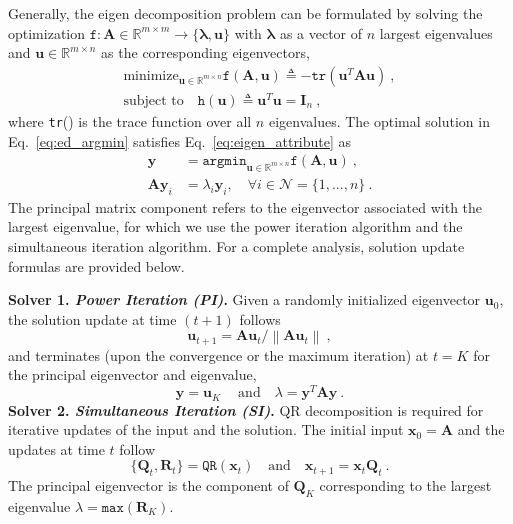 \documentclass{article}
\newcommand{\mb}[1]{\mathbf{#1}}
\newcommand\norm[1]{\left\lVert#1\right\rVert}
\theoremstyle{plain}
\theoremstyle{definition}
\theoremstyle{remark}
\begin{document}
Generally, the eigen decomposition problem can be formulated by solving the optimization $\texttt{f}: \mb{A} \in \mathbb{R}^{m \times m} \rightarrow \{ \boldsymbol{\lambda}, \mb{u} \}$ with $\boldsymbol{\lambda}$ as a vector of $n$ largest eigenvalues and $\mb{u} \in \mathbb{R}^{m \times n}$ as the corresponding eigenvectors,
%
\begin{equation}
\begin{gathered}
\label{eq:ed}
\text{minimize}_{\mb{u} \in \mathbb{R}^{m \times n}} \texttt{f}(\mb{A}, \mb{u}) \triangleq -\texttt{tr} \left( \mb{u}^T \mb{A} \mb{u} \right)\ ,\\
\text{subject to} \quad \texttt{h} \left( \mb{u} \right) \triangleq \mb{u}^T \mb{u} = \mb{I}_n\ ,
\end{gathered}
\end{equation}
%
where \texttt{tr}() is the trace function over all $n$ eigenvalues.
The optimal solution in Eq.~\eqref{eq:ed_argmin} satisfies Eq.~\eqref{eq:eigen_attribute} as
%
\begin{align}
\mb{y} &= \texttt{argmin}_{\mb{u} \in \mathbb{R}^{m \times n}} \texttt{f}(\mb{A}, \mb{u})\label{eq:ed_argmin}\ ,\\
\mb{A} \mb{y}_i &= \lambda_i \mb{y}_i, \quad \forall i \in \mathcal{N} = \{1, ..., n\} \label{eq:eigen_attribute}\ .
\end{align}
%
The principal matrix component refers to the eigenvector associated with the largest
eigenvalue, for which we use the power iteration algorithm and the simultaneous iteration algorithm.
For a complete analysis, solution update formulas are provided below.

\textbf{Solver 1. \textit{Power Iteration (PI)}.}
Given a randomly initialized eigenvector $\mb{u}_0$, the solution update at
time $(t+1)$ follows
%
\begin{equation}
\label{eq:pi_update}
    \mb{u}_{t+1} = \mb{A} \mb{u}_t / \norm{ \mb{A} \mb{u}_t }\ ,
\end{equation}
and terminates (upon the convergence or the maximum iteration) at $t=K$ for the principal eigenvector and eigenvalue,
%
\begin{equation}
\label{eq:pi_optimal}
    \mb{y} = \mb{u}_K\ \quad \text{and} \quad
    \lambda = \mb{y}^T \mb{A} \mb{y}\ .
\end{equation}
%
\textbf{Solver 2. \textit{Simultaneous Iteration (SI)}.}
QR decomposition is required for iterative updates of the input and the solution.
The initial input $\mb{x}_0=\mb{A}$ and the updates at time $t$ follow
%
\begin{equation}
\label{eq:si_update}
    \{\mb{Q}_t, \mb{R}_t\} = \texttt{QR}(\mb{x}_t) \quad \text{and} \quad
    \mb{x}_{t+1} = \mb{x}_t \mb{Q}_t\ .
\end{equation}
The principal eigenvector is the component of $\mb{Q}_K$ corresponding to the largest eigenvalue $\lambda=\texttt{max} (\mb{R}_K)$.
\end{document}
